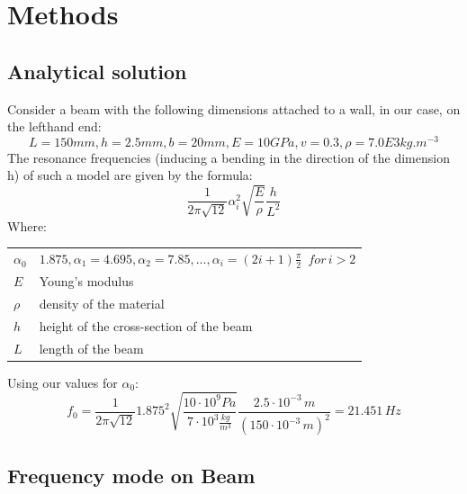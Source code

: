\documentclass[12pt]{article}
\makeatletter
\newenvironment{conditions}
  {\par\vspace{\abovedisplayskip}\noindent\begin{tabular}{>{$}l<{$} @{${}={}$} l}}
  {\end{tabular}\par\vspace{\belowdisplayskip}}
\makeatother
\begin{document}

\section{Methods}

\subsection{Analytical solution}
Consider a beam with the following dimensions attached to a wall, in our case, 
on the lefthand end:
\begin{equation}\label{eq:1}
  L=150mm, h=2.5mm, b=20mm, E=10GPa, v=0.3, \rho=7.0E3kg.m^{-3}
\end{equation}
The resonance frequencies (inducing a bending in the direction of the dimension h) of
such a model are given by the formula:
\begin{equation}\label{eq:2}
  \frac{1}{2\pi\sqrt{12}}\alpha_i^2\sqrt{\frac{E}{\rho}}\frac{h}{L^2}
\end{equation}
Where:
\begin{conditions}
  \alpha_0 & $1.875,\alpha_1=4.695,\alpha_2=7.85,...,\alpha_i=(2i+1)\frac{\pi}{2} \enspace  for \, i>2$ \\
  E     &  Young's modulus \\
  \rho  &  density of the material \\   
  h     &  height of the cross-section of the beam \\
  L     &  length of the beam
\end{conditions}
\noindent Using our values for $\alpha_0$:
\begin{equation}\label{eq:3}
  f_0 = \frac{1}{2\pi\sqrt{12}}1.875^2\sqrt{\frac{10 \cdot 10^9 Pa}{7\cdot10^3 
  \frac{kg}{m^3}}}\frac{2.5 \cdot 10^{-3} \, m}{(150 \cdot 10^{-3} \, m)^2} = 21.451 \, Hz
\end{equation}
\newpage
\subsection{Frequency mode on Beam}
\end{document}
